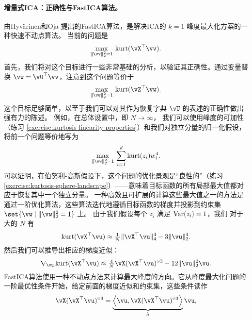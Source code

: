 \documentclass[../../book-main.tex]{subfiles}
\begin{document}
\paragraph{增量式ICA：正确性与FastICA算法。}
由Hyv\"{a}rinen和Oja \cite{hyvarinen-1997} 提出的FastICA算法，是解决ICA的 $k=1$ 峰度最大化方案的一种快速不动点算法。
当前的问题是
\begin{equation}\label{eq:kurtosis-maximization-sphere-finitesample}
    \max_{\norm{\vv}_2^2 = 1}\, \kurt(\vX^\top \vv).
\end{equation}
首先，我们将对这个目标进行一些非常基础的分析，以验证其正确性。通过变量替换 $\vw = \vU^\top \vv$，注意到这个问题等价于
\begin{equation*}
    \max_{\norm{\vw}_2^2 = 1}\, 
    \mathrm{kurt}(\vZ^\top \vw).
\end{equation*}
这个目标足够简单，以至于我们可以对其作为恢复字典 $\vU$ 的表述的正确性做出强有力的陈述。
例如，在总体设置中，即 $N \to \infty$，
我们可以使用峰度的可加性（练习 \ref{exercise:kurtosis-linearity-properties}）和我们对独立分量的归一化假设，将前一个问题等价地写为
\begin{equation}\label{eq:kurtosis-maximization-sphere-population-simple}
    \max_{\norm{\vw}_2^2 = 1}\, 
    \sum_{i=1}^d \mathrm{kurt}(z_i) w_i^4.
\end{equation}
可以证明，在伯努利-高斯假设下，这个问题的优化景观是“良性的”（练习 \ref{exercise:kurtosis-sphere-landscape}）——意味着目标函数的所有局部最大值都对应于恢复其中一个独立分量。
一种高效且可扩展的计算这些最大值之一的方法是通过一阶优化算法，这些算法迭代地遵循目标函数的梯度并投影到约束集 $\set{\vw \given \norm{\vw}_2^2 = 1}$ 上。
由于我们假设每个 $z_i$ 满足 $\operatorname{Var}(z_i)=1$，我们
对于大的 $N$ 有
\begin{equation}\label{eq:kurtosis-approximation-l4}
    \kurt(\vX^\top \vu)
    \approx
    \tfrac{1}{N} \norm{\vX^\top \vu}_4^4 - 3 \norm{\vu}_2^4.
\end{equation}
然后我们可以推导出相应的梯度近似：
\begin{equation*}
    \nabla_{\vu} \kurt(\vX^\top \vu)
    \approx
    \tfrac{4}{N} \vX (\vX^\top \vu)^{\hada 3}
    - 12 \norm{\vu}_2^2 \vu.
\end{equation*}
FastICA算法使用一种不动点方法来计算最大峰度的方向。它从峰度最大化问题的一阶最优性条件开始，给定前面的梯度近似和约束集，这些条件读作
\begin{align}\label{eq:kurtosis-max-sphere-stationarity}
   \vX (\vX^\top \vu)^{\hada 3} 
   = 
   \underbrace{
   \ip*{\vu}{
   \vX (\vX^\top \vu)^{\hada 3} 
   }}_{\lambda} \vu,
\end{align}
\end{document}
